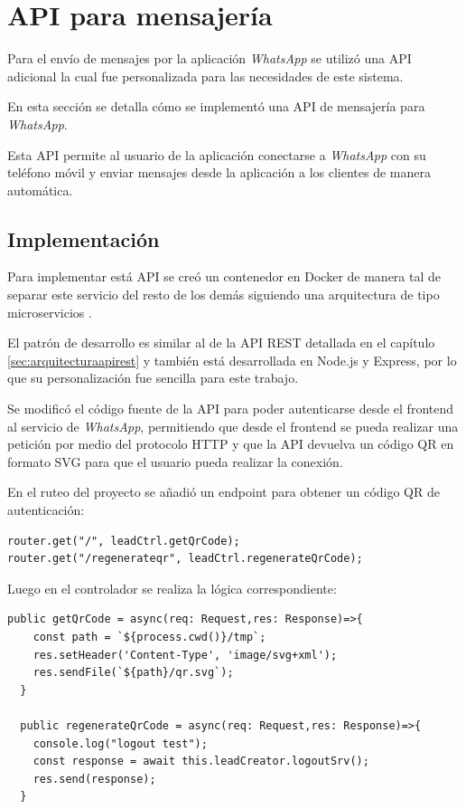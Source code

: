 \section{API para mensajería}
\label{sec:apimessenger}

Para el envío de mensajes por la aplicación \textit{WhatsApp} \cite{whatsapp} se utilizó una API adicional \cite{api-whatsapp-ts} la cual fue personalizada para las necesidades de este sistema.

En esta sección se detalla cómo se implementó una API de mensajería para \textit{WhatsApp}.

Esta API permite al usuario de la aplicación conectarse a \textit{WhatsApp} con su teléfono móvil y enviar mensajes desde la aplicación a los clientes de manera automática.

\subsection{Implementación}
\label{subsec:apimessengerimplementación}

Para implementar está API se creó un contenedor en Docker de manera tal de separar este servicio del resto de los demás siguiendo una arquitectura de tipo microservicios \cite{microservices-docs}.

El patrón de desarrollo es similar al de la API REST detallada en el capítulo \ref{sec:arquitecturaapirest} y también está desarrollada en Node.js y Express, por lo que su personalización fue sencilla para este trabajo.

Se modificó el código fuente de la API para poder autenticarse desde el frontend al servicio de \textit{WhatsApp}, permitiendo que desde el frontend se pueda realizar una petición por medio del protocolo HTTP y que la API devuelva un código QR \cite{qr-code} en formato SVG \cite{svg-format} para que el usuario pueda realizar la conexión. 

En el ruteo del proyecto se añadió un endpoint para obtener un código QR de autenticación:

\begin{lstlisting}[label=cod:apimessengerroute,caption=Endpoint para obtener código QR.]
router.get("/", leadCtrl.getQrCode);
router.get("/regenerateqr", leadCtrl.regenerateQrCode);
\end{lstlisting}

Luego en el controlador se realiza la lógica correspondiente:

\begin{lstlisting}[label=cod:apimessengercontroller,caption=Controlador de ruta para obtener código QR.]
  public getQrCode = async(req: Request,res: Response)=>{
    const path = `${process.cwd()}/tmp`;
    res.setHeader('Content-Type', 'image/svg+xml');
    res.sendFile(`${path}/qr.svg`);
  }

  public regenerateQrCode = async(req: Request,res: Response)=>{
    console.log("logout test");
    const response = await this.leadCreator.logoutSrv();
    res.send(response);
  }
\end{lstlisting}

